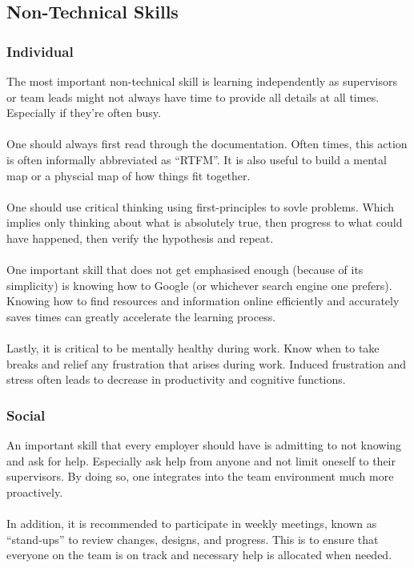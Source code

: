 \documentclass[10pt,letterpaper]{article}
\begin{document}
\subsection{Non-Technical Skills}

\subsubsection{Individual}

The most important non-technical skill is learning independently as supervisors or team leads might not always have time to provide all details at all times. Especially if they're often busy.\\
\\
One should always first read through the documentation. Often times, this action is often informally abbreviated as ``RTFM''. It is also useful to build a mental map or a physcial map of how things fit together.\\
\\
One should use critical thinking using first-principles to sovle problems. Which implies only thinking about what is absolutely true, then progress to what could have happened, then verify the hypothesis and repeat.\\
\\
One important skill that does not get emphasised enough (because of its simplicity) is knowing how to Google (or whichever search engine one prefers). Knowing how to find resources and information online efficiently and accurately saves times can greatly accelerate the learning process.\\
\\
Lastly, it is critical to be mentally healthy during work. Know when to take breaks and relief any frustration that arises during work. Induced frustration and stress often leads to decrease in productivity and cognitive functions.\\

\subsubsection{Social}

An important skill that every employer should have is admitting to not knowing and ask for help. Especially ask help from anyone and not limit oneself to their supervisors. By doing so, one integrates into the team environment much more proactively.\\
\\
In addition, it is recommended to participate in weekly meetings, known as ``stand-ups'' to review changes, designs, and progress. This is to ensure that everyone on the team is on track and necessary help is allocated when needed.\\
\end{document}
